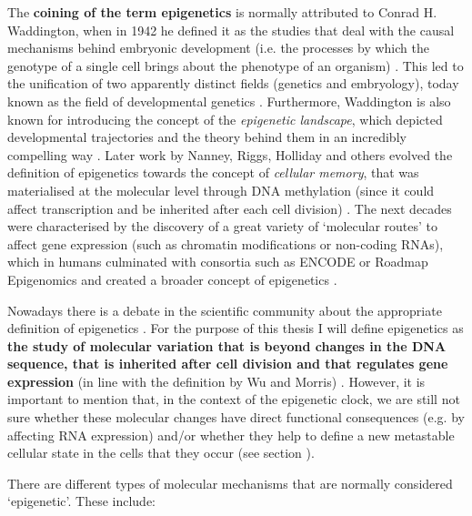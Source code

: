 \smallskip

The \textbf{coining of the term epigenetics} is normally attributed to Conrad H. Waddington, when in 1942 he defined it as the studies that deal with the causal mechanisms behind embryonic development (i.e. the processes by which the genotype of a single cell brings about the phenotype of an organism) \cite{Waddington1942}. This led to the unification of two apparently distinct fields (genetics and embryology), today known as the field of developmental genetics \cite{Gilbert2011}. Furthermore, Waddington is also known for introducing the concept of the \textit{epigenetic landscape}, which depicted developmental trajectories and the theory behind them in an incredibly compelling way \cite{Waddington1957}. Later work by Nanney, Riggs, Holliday and others evolved the definition of epigenetics towards the concept of \textit{cellular memory}, that was materialised at the molecular level through DNA methylation (since it could affect transcription and be inherited after each cell division) \cite{Lappalainen2017}. The next decades were characterised by the discovery of a great variety of `molecular routes' to affect gene expression (such as chromatin modifications or non-coding RNAs), which in humans culminated with consortia such as ENCODE \cite{Consortium2012} or Roadmap Epigenomics \cite{Consortium2015} and created a broader concept of epigenetics \cite{Lappalainen2017,Greally2018}.

\bigskip

Nowadays there is a debate in the scientific community about the appropriate definition of epigenetics \cite{Greally2018,Bird2007}. For the purpose of this thesis I will define epigenetics as \textbf{the study of molecular variation that is beyond changes in the DNA sequence, that is inherited after cell division and that regulates gene expression} (in line with the definition by Wu and Morris) \cite{Wu2001}. However, it is important to mention that, in the context of the epigenetic clock, we are still not sure whether these molecular changes have direct functional consequences (e.g. by affecting RNA expression) and/or whether they help to define a new metastable cellular state in the cells that they occur (see section ).

\bigskip

There are different types of molecular mechanisms that are normally considered `epigenetic'. These include:

